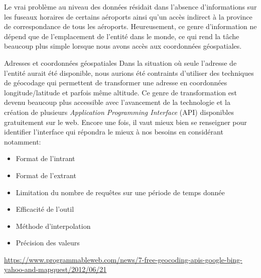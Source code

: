 Le vrai problème au niveau des données résidait dans l'absence d'informations sur les fuseaux horaires de certains aéroports ainsi qu'un accès indirect à la province de correspondance de tous les aéroports. Heureusement, ce genre d'information ne dépend que de l'emplacement de l'entité dans le monde, ce qui rend la tâche beaucoup plus simple lorsque nous avons accès aux coordonnées géospatiales. \\

\begin{moreInfo}{Adresses et coordonnées géospatiales}
	Dans la situation où seule l'adresse de l'entité aurait été disponible, nous aurions été contraints d'utiliser des techniques de géocodage qui permettent de transformer une adresse en coordonnées longitude/latitude et parfois même altitude. Ce genre de transformation est devenu beaucoup plus accessible avec l'avancement de la technologie et la création de plusieurs \emph{Application Programming Interface} (API) disponibles gratuitement sur le web. Encore une fois, il vaut mieux bien se renseigner pour identifier l'interface qui répondra le mieux à nos besoins en considérant notamment:
	\begin{itemize}
		\item Format de l'intrant
		\item Format de l'extrant
		\item Limitation du nombre de requêtes sur une période de temps donnée
		\item Efficacité de l'outil
		\item Méthode d'interpolation
		\item Précision des valeurs
	\end{itemize}
	\url{https://www.programmableweb.com/news/7-free-geocoding-apis-google-bing-yahoo-and-mapquest/2012/06/21}
\end{moreInfo}

